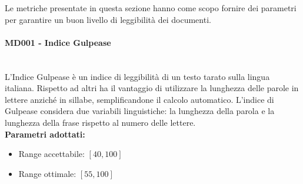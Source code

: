 Le metriche presentate in questa sezione hanno come scopo fornire dei parametri per garantire un buon livello di leggibilità dei documenti.

\paragraph{MD001 - Indice Gulpease}\mbox{}\\[0,3cm]
L'Indice Gulpease è un indice di leggibilità di un testo tarato sulla lingua italiana. Rispetto ad altri ha il vantaggio di utilizzare la lunghezza delle parole in lettere anziché in sillabe, semplificandone il calcolo automatico.
L'indice di Gulpease considera due variabili linguistiche: la lunghezza della parola e la lunghezza della frase rispetto al numero delle lettere.\\[0,2cm]
\textbf{Parametri adottati:}
\begin{itemize}
	\item Range accettabile: $[40 , 100]$
	\item Range ottimale: $[55 , 100]$
\end{itemize}
